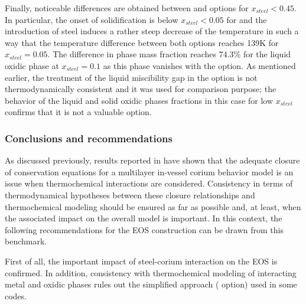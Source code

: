 Finally, noticeable differences are obtained between  and  options for $x_{steel} < 0.45$. In particular, the onset of solidification is below $x_{steel} < 0.05$ for  and the introduction of steel induces a rather steep decrease of the temperature in such a way that the temperature difference between both options reaches 139K for $x_{steel} = 0.05$. The difference in phase mass fraction reaches 74.3\% for the liquid oxidic phase at $x_{steel} = 0.1$ as this phase vanishes with the  option. As mentioned earlier, the treatment of the liquid miscibility gap in the  option is not thermodynamically consistent and it was used for comparison purpose; the behavior of the liquid and solid oxidic phases fractions in this case for low $x_{steel}$ confirms that it is not a valuable option.

\subsubsection{Conclusions and recommendations}

As discussed previously, results reported in \cite{Bakouta2015} have shown that the adequate closure of conservation equations for a multilayer in-vessel corium behavior model is an issue when thermochemical interactions are considered. Consistency in terms of thermodynamical hypotheses between these closure relationships and thermochemical modeling should be ensured as far as possible and, at least, when the associated impact on the overall model is important. In this context, the following recommendations for the EOS construction can be drawn from this benchmark.

First of all, the important impact of steel-corium interaction on the EOS is confirmed. In addition, consistency with thermochemical modeling of interacting metal and oxidic phases rules out the simplified approach ( option) used in some codes.

